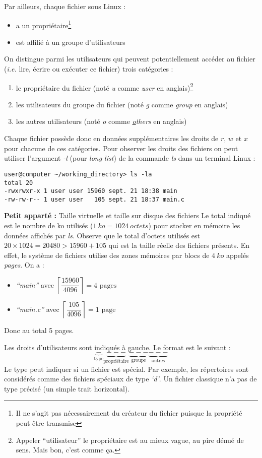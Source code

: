 \documentclass[../../../main.tex]{subfiles}
\begin{document}
Par ailleurs, chaque fichier sous Linux :
\begin{itemize}
	\item a un propriétaire\footnote{Il ne s'agit pas nécessairement du créateur du fichier puisque la propriété peut être transmise}
	\item est affilié à un groupe d'utilisateurs
\end{itemize}
On distingue parmi les utilisateurs qui peuvent potentiellement accéder au fichier (\textit{i.e.} lire, écrire ou exécuter ce fichier) trois catégories :
\begin{enumerate}
	\item le propriétaire du fichier (noté \textit{u} comme \textit{\underline{u}ser} en anglais)\footnote{Appeler ``utilisateur'' le propriétaire est au mieux vague, au pire dénué de sens. Mais bon, c'est comme ça.}
	\item les utilisateurs du groupe du fichier (noté \textit{g} comme \textit{\underline{g}roup} en anglais)
	\item les autres utilisateurs (noté \textit{o} comme \textit{\underline{o}thers} en anglais)
\end{enumerate}
Chaque fichier possède donc en données supplémentaires les droits de $r$, $w$ et $x$ pour chacune de ces catégories. \newline
Pour observer les droits des fichiers on peut utiliser l'argument \textit{-l} (pour \textit{long list}) de la commande \textit{ls} dans un terminal Linux :
\begin{verbatim}
user@computer ~/working_directory> ls -la
total 20
-rwxrwxr-x 1 user user 15960 sept. 21 18:38 main
-rw-rw-r-- 1 user user	 105 sept. 21 18:37 main.c
\end{verbatim}
\begin{minitelbasicbox}{\textbf{Petit apparté :} Taille virtuelle et taille sur disque des fichiers}
Le total indiqué est le nombre de ko utilisés ($1\ ko = 1024\ octets$) pour stocker en mémoire les données affichés par \textit{ls}. Observe que le total d'octets utilisés est $20\times{1024} = 20480>15960 + 105$ qui est la taille réelle des fichiers présents. En effet, le système de fichiers utilise des zones mémoires par blocs de $4\ ko$ appelés \textit{pages}. On a :
\begin{itemize}
	\item \textit{``main''} avec $\left\lceil\dfrac{15960}{4096}\right\rceil = 4 \text{ pages}$
	\item \textit{``main.c''} avec $\left\lceil\dfrac{105}{4096}\right\rceil = 1\text{\ page}$
\end{itemize}
Donc au total 5 pages.
\end{minitelbasicbox}
Les droits d'utilisateurs sont indiqués à gauche. Le format est le suivant :
$$\underbrace{-}_{\text{type}}\underbrace{---}_{\text{propriétaire}}\underbrace{---}_{\text{groupe}}\underbrace{---}_{\text{autres}}$$
Le type peut indiquer si un fichier est spécial. Par exemple, les répertoires sont considérés comme des fichiers spéciaux de type \textit{`d'}. Un fichier classique n'a pas de type précisé (un simple trait horizontal).
 
\end{document}
